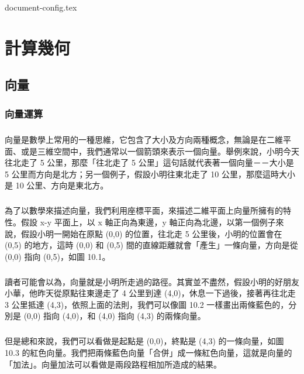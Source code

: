 \documentclass[12pt,a4paper,oneside]{report}
\begin{document}
\begin{CJK}{UTF8}{bkai}

{document-config.tex}

\fi

\newcommand{\True}{\textsc{True}}
\newcommand{\False}{\textsc{False}}

\chapter{計算幾何}

\section{向量}
\subsection{向量運算}

\paragraph{}向量是數學上常用的一種思維，它包含了大小及方向兩種概念，無論是在二維平面、或是三維空間中，我們通常以一個箭頭來表示一個向量。舉例來說，小明今天往北走了 5 公里，那麼「往北走了 5 公里」這句話就代表著一個向量－－大小是 5 公里而方向是北方；另一個例子，假設小明往東北走了 10 公里，那麼這時大小是 10 公里、方向是東北方。
\paragraph{}為了以數學來描述向量，我們利用座標平面，來描述二維平面上向量所擁有的特性。假設 x-y 平面上，以 x 軸正向為東邊，y 軸正向為北邊，以第一個例子來說，假設小明一開始在原點 (0,0) 的位置，往北走 5 公里後，小明的位置會在 (0,5) 的地方，這時 (0,0) 和 (0,5) 間的直線距離就會「產生」一條向量，方向是從 (0,0) 指向 (0,5)，如圖 10.1。
\paragraph{}讀者可能會以為，向量就是小明所走過的路徑。其實並不盡然，假設小明的好朋友小華，他昨天從原點往東邊走了 4 公里到達 (4,0)，休息一下過後，接著再往北走 3 公里抵達 (4,3)，依照上面的法則，我們可以像圖 10.2 一樣畫出兩條藍色的，分別是 (0,0) 指向 (4,0)，和 (4,0) 指向 (4,3) 的兩條向量。
\paragraph{}但是總和來說，我們可以看做是起點是 (0,0)，終點是 (4,3) 的一條向量，如圖 10.3 的紅色向量。我們把兩條藍色向量「合併」成一條紅色向量，這就是向量的「加法」。向量加法可以看做是兩段路程相加所造成的結果。

\end{CJK}
\end{document}
